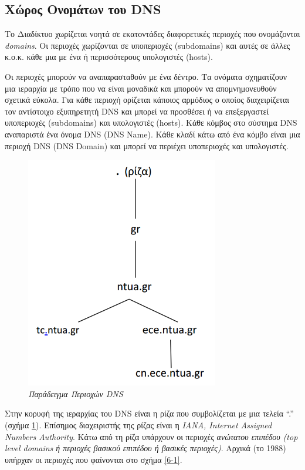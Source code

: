 %
%
\subsection{Χώρος Ονομάτων του DNS}

Το Διαδίκτυο χωρίζεται νοητά σε εκατοντάδες διαφορετικές περιοχές που ονομάζονται \emph{domains}. Οι περιοχές χωρίζονται σε υποπεριοχές (subdomains) και αυτές σε άλλες κ.ο.κ. κάθε μια με ένα ή περισσότερους υπολογιστές (hosts).

Οι περιοχές μπορούν να αναπαρασταθούν με ένα δέντρο. Τα ονόματα σχηματίζουν μια ιεραρχία με τρόπο που να είναι μοναδικά και μπορούν να απομνημονευθούν σχετικά εύκολα. Για κάθε περιοχή ορίζεται κάποιος αρμόδιος ο οποίος διαχειρίζεται τον αντίστοιχο εξυπηρετητή DNS και μπορεί να προσθέσει ή να επεξεργαστεί υποπεριοχές (subdomains) και υπολογιστές (hosts). Κάθε κόμβος στο σύστημα DNS αναπαριστά ένα όνομα DNS (DNS Name). Κάθε κλαδί κάτω από ένα κόμβο είναι μια περιοχή DNS (DNS Domain) και μπορεί να περιέχει υποπεριοχές και υπολογιστές.   

\begin{figure}[!ht]
  \centering
  \includegraphics[width=0.75\textwidth]{images/chapter6/6-0}
  \caption {\textsl{Παράδειγμα Περιοχών DNS}}
  \label{6-0}
\end{figure}

Στην κορυφή της ιεραρχίας του DNS είναι η ρίζα που συμβολίζεται με μια τελεία ``.'' (σχήμα \ref{6-0}). Επίσημος διαχειριστής της ρίζας είναι η \emph{IANA, Internet Assigned Numbers Authority}. Κάτω από τη ρίζα υπάρχουν οι περιοχές \emph{ανώτατου επιπέδου (top level domains ή περιοχές βασικού επιπέδου ή βασικές περιοχές)}. Αρχικά (το 1988) υπήρχαν οι περιοχές που φαίνονται στο σχήμα \ref{6-1}.

